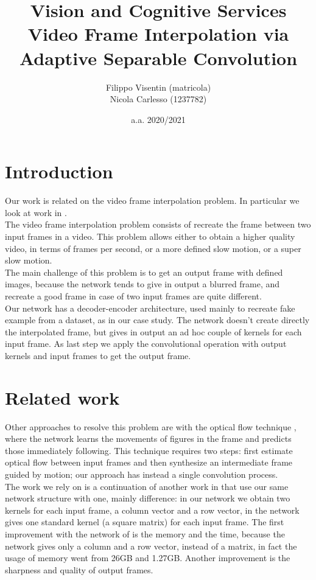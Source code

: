 \documentclass[11pt, a4paper]{article}
\title{Vision and Cognitive Services\\
\large Video Frame Interpolation via Adaptive Separable Convolution}
\author{Filippo Visentin (matricola)\\
Nicola Carlesso (1237782)}
\date{a.a. 2020/2021}
\begin{document}
	\maketitle
	\newpage
	
	\tableofcontents
	\newpage
	
	\section{Introduction}
	Our work is related on the video frame interpolation problem. In particular we look at work in \cite{mainpaper}.\\
	The video frame interpolation problem consists of recreate the frame between two input frames in a video. This problem allows either to obtain a higher quality video, in terms of frames per second, or a more defined slow motion, or a super slow motion.\\
	The main challenge of this problem is to get an output frame with defined images, because the network tends to give in output a blurred frame, and recreate a good frame in case of two input frames are quite different.\\
	Our network has a decoder-encoder architecture, used mainly to recreate fake example from a dataset, as in our case study. The network doesn't create directly the interpolated frame, but gives in output an ad hoc couple of kernels for each input frame. As last step we apply the convolutional operation with output kernels and input frames to get the output frame. 
	
	\section{Related work}
	Other approaches to resolve this problem are with the optical flow technique \cite{optical_flow}, where the network learns the movements of figures in the frame and predicts those immediately following. This technique requires two steps: first estimate optical flow between input frames and then synthesize an intermediate frame guided by motion; our approach has instead a single convolution process.\\
	The work we rely on is a continuation of another work in \cite{previous_work} that use our same network structure with one, mainly difference: in our network we obtain two kernels for each input frame, a column vector and a row vector, in \cite{optical_flow} the network gives one standard kernel (a square matrix) for each input frame. The first improvement with the network of \cite{mainpaper} is the memory and the time, because the network gives only a column and a row vector, instead of a matrix, in fact the usage of memory went from 26GB and 1.27GB. Another improvement is the sharpness and quality of output frames.
	
\end{document}
